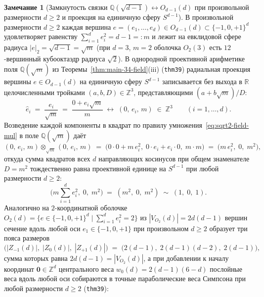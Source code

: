 \documentclass[11pt,a4paper]{article}
\theoremstyle{plain}
\theoremstyle{definition}
\newtheorem{remark}[theorem]{Замечание}
\begin{document}
\begin{remark}[Замкнутость связки $\mathbb{Q}(\sqrt{d-1}) \leftrightarrow O_{d-1}(d)$ при произвольной размерности $d \ge 2$ и проекция на единичную сферу $S^{d-1}$]
\label{rem:q-sqrt2-cuboctahedron-closure}
В произвольной размерности $d \ge 2$ каждая вершина $e = (e_1, \dots, e_d) \in O_{d-1}(d) \subset \{-1, 0, +1\}^d$ удовлетворяет равенству $\sum_{i=1}^d e_i^2 = d - 1 =: m$ и лежит на евклидовой сфере радиуса $|e|_2 = \sqrt{d - 1} = \sqrt{m}$ (при $d = 3$, $m = 2$ оболочка $O_2(3)$ есть $12$-вершинный кубооктаэдр радиуса $\sqrt{2}$). В однородной проективной арифметике поля $\mathbb{Q}(\sqrt{m})$ из Теоремы~\ref{thm:main-34-field}(iii) (\texttt{thm39}) радиальная проекция вершины $e \in O_{d-1}(d)$ на единичную сферу $S^{d-1}$ записывается без выхода в $\mathbb{R}$ целочисленными тройками $(a, b, D) \in \mathbb{Z}^3$, представляющими $(a + b\sqrt{m})/D$:
\begin{equation}
  \label{eq:unit-sphere-sqrt2-triple}
  \hat{e}_i \;=\; \frac{e_i}{\sqrt{m}} \;=\; \frac{0 + e_i\sqrt{m}}{m} \;\longleftrightarrow\; (0,\, e_i,\, m) \;\in\; \mathbb{Z}^3
  \qquad (i = 1, \dots, d).
\end{equation}
Возведение каждой компоненты в квадрат по правилу умножения~\eqref{eq:sqrt2-field-mul} в поле $\mathbb{Q}(\sqrt{m})$ даёт
\begin{equation}
  \label{eq:unit-sphere-sqrt2-square}
  (0,\, e_i,\, m) \otimes_{\sqrt{m}} (0,\, e_i,\, m) \;=\; \bigl(0\cdot 0 + m\,e_i^2,\; 0\cdot e_i + e_i\cdot 0,\; m\cdot m\bigr) \;=\; \bigl(m\,e_i^2,\; 0,\; m^2\bigr),
\end{equation}
откуда сумма квадратов всех $d$ направляющих косинусов при общем знаменателе $D = m^2$ тождественно равна проективной единице на $S^{d-1}$ при любой размерности $d \ge 2$:
\begin{equation}
  \label{eq:unit-sphere-sqrt2-norm1}
  \biggl(m\sum_{i=1}^{d} e_i^2,\; 0,\; m^2\biggr) \;=\; (m^2,\; 0,\; m^2) \;\sim\; (1,\; 0,\; 1).
\end{equation}
Аналогично на $2$-координатной оболочке $O_2(d) = \{e \in \{-1, 0, +1\}^d \mid \sum_{i=1}^d e_i^2 = 2\}$ из $|V_{O_2}(d)| = 2d(d-1)$ вершин сечение вдоль любой оси $e_1 \in \{-1, 0, +1\}$ при произвольном $d \ge 2$ образует три пояса размеров
\begin{equation}
  \label{eq:belt-sizes-general-d}
  \bigl(|Z_{-1}(d)|,\; |Z_0(d)|,\; |Z_{+1}(d)|\bigr) \;=\; \bigl(2(d-1),\; 2(d-1)(d-2),\; 2(d-1)\bigr),
\end{equation}
сумма которых равна $2d(d-1) = |V_{O_2}(d)|$, а при добавлении к началу координат $\mathbf{0} \in \mathbb{Z}^d$ центрального веса $w_0(d) = 2(d-1)(6-d)$ послойные веса вдоль любой оси собираются в точные параболические веса Симпсона при любой размерности $d \ge 2$ (\texttt{thm39}):

\end{remark}
\end{document}
